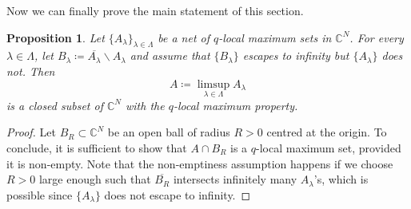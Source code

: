 \documentclass[reqno,oneside]{amsart}
\newcommand{\numberset}{\mathbb}
\newcommand{\C}{\numberset{C}}
\theoremstyle{definition}
\theoremstyle{plain}
\newtheorem{proposition}[definition]{Proposition}
\theoremstyle{remark}
\begin{document}
Now we can finally prove the main statement of this section.
\begin{proposition}
\label{prop:limsup}
	Let $\{A_\lambda\}_{\lambda\in\Lambda}$ be a net of $q$-local maximum sets in $\C^N$. For every $\lambda\in\Lambda$, let $B_\lambda\coloneqq\overline{A_\lambda}\smallsetminus A_\lambda$ and assume that $\{B_\lambda\}$ escapes to infinity but $\{A_\lambda\}$ does not. Then
	\[
		A\coloneqq\limsup_{\lambda\in\Lambda} A_\lambda
	\]
	is a closed subset of $\C^N$ with the $q$-local maximum property.
\end{proposition}
\begin{proof}
	Let $B_R\subset\C^N$ be an open ball of radius $R>0$ centred at the origin. To conclude, it is sufficient to show that $A\cap B_R$ is a $q$-local maximum set, provided it is non-empty. Note that the non-emptiness assumption happens if we choose $R>0$ large enough such that $\overline{B_R}$ intersects infinitely many $A_\lambda$'s, which is possible since $\{A_\lambda\}$ does not escape to infinity.
	

\end{proof}
\end{document}
